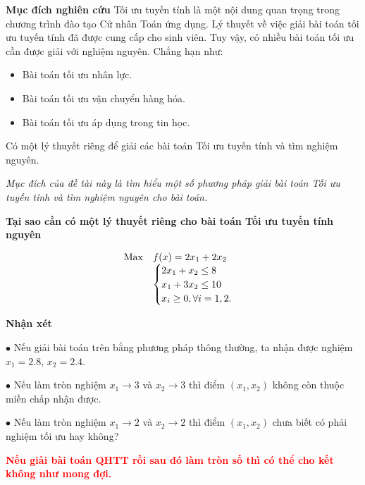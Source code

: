 \documentclass{beamer}
\begin{document}
\begin{frame}{\bf Mục đích nghiên cứu}
    Tối ưu tuyến tính là một nội dung quan trọng trong chương trình đào tạo Cử nhân Toán ứng dụng. Lý thuyết về việc giải bài toán tối ưu tuyến tính đã được cung cấp cho sinh viên. Tuy vậy, có nhiều bài toán tối ưu cần được giải với nghiệm nguyên. Chẳng hạn như:
    \begin{itemize}
    \item Bài toán tối ưu nhân lực.
    \item Bài toán tối ưu vận chuyển hàng hóa.
    \item Bài toán tối ưu áp dụng trong tin học.
    \end{itemize}
    
  \bigskip
  Có một lý thuyết riêng để giải các bài toán Tối ưu tuyến tính và tìm nghiệm nguyên.
  \bigskip
  
{\it Mục đích của đề tài này là tìm hiểu một số phương pháp giải bài toán Tối ưu tuyến tính và tìm nghiệm nguyên cho bài toán.}  
    
\end{frame}
\begin{frame}{\bf Tại sao cần có một lý thuyết riêng cho bài toán Tối ưu tuyến tính nguyên}

$$
    \begin{array}{lll}            
        {\rm Max}&f(x)=2x_1+2x_2\\
            & \begin{cases}
            2x_1+x_2 \leq  8 \\
            x_1+3x_2 \leq 10 \\
            x_i\geq 0,\forall i=1,2.
           \end{cases} 
     \end{array}
$$  
  \end{frame}


\begin{frame}{\bf Nhận xét}

$\bullet$  Nếu giải bài toán trên bằng phương pháp thông thường, ta nhận được nghiệm $x_1=2.8$, $x_2=2.4$.
\medskip
      
      $\bullet$ Nếu làm tròn nghiệm $x_1 \to 3$ và $x_2 \to 3$ thì điểm $(x_1,x_2)$ không còn thuộc miền chấp nhận được.
      
 \medskip
      
      $\bullet$ Nếu làm tròn nghiệm $x_1 \to 2$ và $x_2 \to 2$ thì điểm $(x_1,x_2)$ chưa biết có phải nghiệm tối ưu hay không?
      
\bigskip
 \textcolor{red}{\bf Nếu giải bài toán QHTT rồi sau đó làm tròn số thì có thể  cho kết không như mong đợi.}
   
\end{frame}
\end{document}
